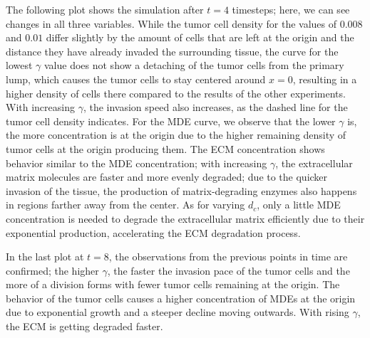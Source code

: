 The following plot shows the simulation after $t=4$ timesteps; here, we can see changes in all three variables. While the tumor cell density for the values of $0.008$ and $0.01$ differ slightly by the amount of cells that are left at the origin and the distance they have already invaded the surrounding tissue, the curve for the lowest $\gamma$ value does not show a detaching of the tumor cells from the primary lump, which causes the tumor cells to stay centered around $x=0$, resulting in a higher density of cells there compared to the results of the other experiments. With increasing $\gamma$, the invasion speed also increases, as the dashed line for the tumor cell density indicates. For the MDE curve, we observe that the lower $\gamma$ is, the more concentration is at the origin due to the higher remaining density of tumor cells at the origin producing them. The ECM concentration shows behavior similar to the MDE concentration; with increasing $\gamma$, the extracellular matrix molecules are faster and more evenly degraded; due to the quicker invasion of the tissue, the production of matrix-degrading enzymes also happens in regions farther away from the center. As for varying $d_c$, only a little MDE concentration is needed to degrade the extracellular matrix efficiently due to their exponential production, accelerating the ECM degradation process.

In the last plot at $t=8$, the observations from the previous points in time are confirmed; the higher $\gamma$, the faster the invasion pace of the tumor cells and the more of a division forms with fewer tumor cells remaining at the origin. The behavior of the tumor cells causes a higher concentration of MDEs at the origin due to exponential growth and a steeper decline moving outwards. With rising $\gamma$, the ECM is getting degraded faster.

